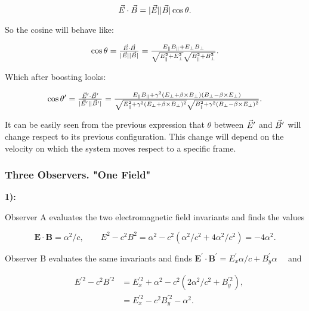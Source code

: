 \begin{equation}
	\vec{E} \cdot \vec{B} = |\vec{E}| |\vec{B}| \cos \theta.
\end{equation}

So the cosine will behave like:

\begin{equation}
	\cos \theta = \tfrac{\vec{E} \cdot \vec{B}}{ |\vec{E}| |\vec{B}|} = \tfrac{E_{\parallel}B_{\parallel} +  E_{\perp}B_{\perp}}{\sqrt{E_{\parallel}^{2} + E_{\perp}^{2} } \sqrt{B_{\parallel}^{2} + B_{\perp}^{2}}}.
\end{equation}

Which after boosting looks:

\begin{equation}
	\cos \theta'= \tfrac{\vec{E}' \cdot \vec{B}'}{ |\vec{E}'| |\vec{B}'|} = \tfrac{E_{\parallel}B_{\parallel} + \gamma^{2} (E_{\perp} + \beta \times B_{\perp}) (B_{\perp} - \beta \times E_{\perp})}{\sqrt{E_{\parallel}^{2} +  \gamma^{2} (E_{\perp} + \beta \times B_{\perp})^2}{\sqrt{B_{\parallel}^{2} +  \gamma^{2} (B_{\perp} - \beta \times E_{\perp})^2}}}.
\end{equation}

It can be easily seen from the previous expression that $\theta$ between $\vec{E}'$ and $\vec{B}'$ will change respect to its previous configuration. This change will depend on the velocity on which the system moves respect to a specific frame. 

\subsubsection{Three Observers. "One Field"}\label{Three Observers. "One Field"}

\textbf{1):}

Observer A evaluates the two electromagnetic field invariants and finds the values

\begin{equation}
	\mathbf{E}\cdot\mathbf{B}=\alpha^{2}/c, \quad\quad E^{2}-c^{2} B^{2}=\alpha^{2}-c^{2}\left(\alpha^{2} / c^{2}+4 \alpha^{2} / c^{2}\right)=-4 \alpha^{2}.
\end{equation} 

Observer B evaluates the same invariants and finds $\mathbf{E}^{\prime} \cdot \mathbf{B}^{\prime}=E_{x}^{\prime} \alpha / c+B_{y}^{\prime} \alpha \quad$ and 

\begin{equation}
	\begin{split}
		\quad E^{\prime 2}-c^{2} B^{\prime 2}&=E_{x}^{\prime 2}+\alpha^{2}-c^{2}\left(2 \alpha^{2} / c^{2}+B_{y}^{\prime 2}\right),\\
		&=E_{x}^{\prime 2}-c^{2} B_{y}^{\prime 2}-\alpha^{2}.
	\end{split}
\end{equation}


